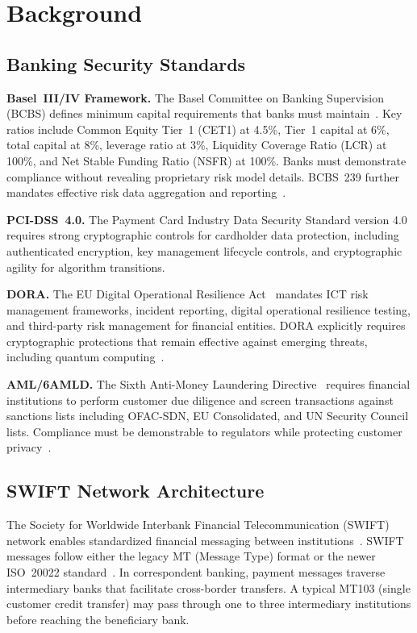\documentclass[conference,10pt]{IEEEtran}
\begin{document}
\section{Background}

\subsection{Banking Security Standards}

\textbf{Basel~III/IV Framework.} The Basel Committee on Banking Supervision (BCBS) defines minimum capital requirements that banks must maintain~\cite{baseliii2017,baseliv2023}. Key ratios include Common Equity Tier~1 (CET1) at 4.5\%, Tier~1 capital at 6\%, total capital at 8\%, leverage ratio at 3\%, Liquidity Coverage Ratio (LCR) at 100\%, and Net Stable Funding Ratio (NSFR) at 100\%. Banks must demonstrate compliance without revealing proprietary risk model details. BCBS~239 further mandates effective risk data aggregation and reporting~\cite{bcbs239}.

\textbf{PCI-DSS~4.0.} The Payment Card Industry Data Security Standard version 4.0~\cite{pcidss4} requires strong cryptographic controls for cardholder data protection, including authenticated encryption, key management lifecycle controls, and cryptographic agility for algorithm transitions.

\textbf{DORA.} The EU Digital Operational Resilience Act~\cite{dora2022} mandates ICT risk management frameworks, incident reporting, digital operational resilience testing, and third-party risk management for financial entities. DORA explicitly requires cryptographic protections that remain effective against emerging threats, including quantum computing~\cite{esma2024dora}.

\textbf{AML/6AMLD.} The Sixth Anti-Money Laundering Directive~\cite{aml6amld} requires financial institutions to perform customer due diligence and screen transactions against sanctions lists including OFAC-SDN, EU Consolidated, and UN Security Council lists. Compliance must be demonstrable to regulators while protecting customer privacy~\cite{fatf2023aml}.

\subsection{SWIFT Network Architecture}

The Society for Worldwide Interbank Financial Telecommunication (SWIFT) network enables standardized financial messaging between institutions~\cite{swift2023}. SWIFT messages follow either the legacy MT (Message Type) format or the newer ISO~20022 standard~\cite{iso20022}. In correspondent banking, payment messages traverse intermediary banks that facilitate cross-border transfers. A typical MT103 (single customer credit transfer) may pass through one to three intermediary institutions before reaching the beneficiary bank.
\end{document}
